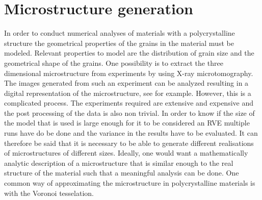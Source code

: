 \documentclass[micro_gen.tex]{subfiles}
\begin{document}
\FloatBarrier

\chapter{Microstructure generation}

In order to conduct numerical analyses of materials with a polycrystalline structure the geometrical properties of the grains in the material must be modeled. Relevant properties to model are the distribution of grain size and the geometrical shape of the grains.
One possibility is to extract the three dimensional microstructure from experiments by using X-ray microtomography. 
The images generated from such an experiment can be analyzed resulting in a digital representation of the microstructure, see for example\cite{Bhandari2007222}.
However, this is a complicated process. The experiments required are extensive and expensive and the post processing of the data is also non trivial. 
 In order to know if the size of the model that is used is large enough for it to be considered an RVE multiple runs have do be done and the variance in the results have to be evaluated. It can therefore be said that it is necessary to be able to generate different realisations of microstructures of different sizes. Ideally, one would want a mathematically analytic description of a microstructure that is similar enough to the real structure of the material such that a meaningful analysis can be done. One common way of approximating the microstructure in polycrystalline materials is with the Voronoi tesselation. 
 
\end{document}
